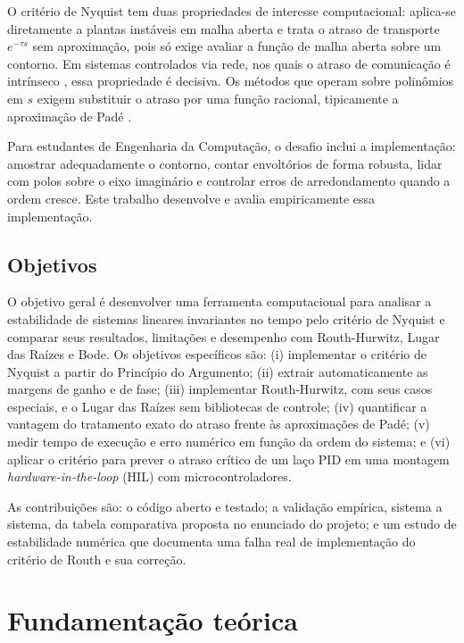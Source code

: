 \documentclass[12pt]{article}
\begin{document}
O critério de Nyquist \cite{nyquist1932} tem duas propriedades de interesse computacional: aplica-se diretamente a plantas instáveis em malha aberta e trata o atraso de transporte $e^{-\tau s}$ sem aproximação, pois só exige avaliar a função de malha aberta sobre um contorno. Em sistemas controlados via rede, nos quais o atraso de comunicação é intrínseco \cite{zhang2001}, essa propriedade é decisiva. Os métodos que operam sobre polinômios em $s$ exigem substituir o atraso por uma função racional, tipicamente a aproximação de Padé \cite{pade1892}.

Para estudantes de Engenharia da Computação, o desafio inclui a implementação: amostrar adequadamente o contorno, contar envoltórios de forma robusta, lidar com polos sobre o eixo imaginário e controlar erros de arredondamento quando a ordem cresce. Este trabalho desenvolve e avalia empiricamente essa implementação.

\subsection{Objetivos}

O objetivo geral é desenvolver uma ferramenta computacional para analisar a estabilidade de sistemas lineares invariantes no tempo pelo critério de Nyquist e comparar seus resultados, limitações e desempenho com Routh-Hurwitz, Lugar das Raízes e Bode. Os objetivos específicos são:
(i) implementar o critério de Nyquist a partir do Princípio do Argumento;
(ii) extrair automaticamente as margens de ganho e de fase;
(iii) implementar Routh-Hurwitz, com seus casos especiais, e o Lugar das Raízes sem bibliotecas de controle;
(iv) quantificar a vantagem do tratamento exato do atraso frente às aproximações de Padé;
(v) medir tempo de execução e erro numérico em função da ordem do sistema; e
(vi) aplicar o critério para prever o atraso crítico de um laço PID em uma montagem \textit{hardware-in-the-loop} (HIL) com microcontroladores.

As contribuições são: o código aberto e testado; a validação empírica, sistema a sistema, da tabela comparativa proposta no enunciado do projeto; e um estudo de estabilidade numérica que documenta uma falha real de implementação do critério de Routh e sua correção.

\section{Fundamentação teórica}
\end{document}
